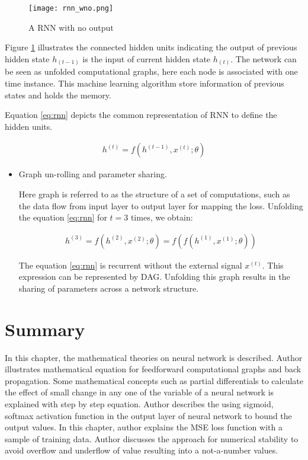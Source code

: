 \begin{figure}[H]
    \centering    
    \texttt{[image: rnn\_wno.png]}
    \caption{A \acl*{RNN} with no output \parencite[Page 370]{Goodfellow-et-al-2016}}
    \label{fig:RNN without output}
\end{figure}


Figure \ref{fig:RNN without output} illustrates the connected hidden units indicating the output of previous hidden state $h_{(t-1)}$ is the input of current hidden state $h_{(t)}$.  The network can be seen as unfolded computational graphs, here each node is associated with one time instance. This machine learning algorithm store information of previous states and holds the memory. 

Equation \ref{eq:rnn} depicts the common representation of RNN to define the hidden units.

\begin{align}
    h^{(t)} = f(h^{(t-1)}, x^{(t)}; \theta) \label{eq:rnn}
 \end{align}


\begin{itemize}
    \item Graph un-rolling and parameter sharing.
    
    Here graph is referred to as the structure of a set of computations, such as the data flow from input layer to output layer for mapping the loss. Unfolding the equation \ref{eq:rnn} for $t=3$ times, we obtain:
    
    \begin{align}
        h^{(3)} = f(h^{(2)}, x^{(2)}; \theta) = f(f(h^{(1)},x^{(1)}; \theta)) \label{eq:rnn_new}
     \end{align}
    

    The equation \ref{eq:rnn} is recurrent without the external signal $x^{(t)}$. This expression can be represented by \acl{DAG}.  Unfolding this graph results in the sharing of parameters across a network structure.


\end{itemize}






\section{Summary}

In this chapter, the mathematical theories on neural network is described. Author illustrates mathematical equation for feedforward computational graphs and back propagation. Some mathematical concepts such as partial differentials to calculate the effect of small change in any one of the variable of a neural network is explained with step by step equation. Author describes the using sigmoid, softmax activation function in the output layer of neural network to bound the output values. In this chapter, author explains the \acl{MSE} loss function with a sample of training data. Author discusses the approach for numerical stability to avoid overflow and underflow of value resulting into a not-a-number values.

